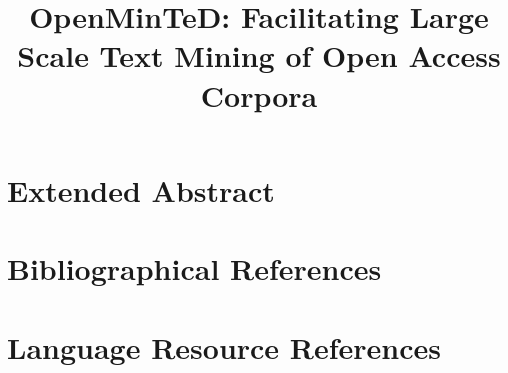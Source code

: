 \documentclass[10pt, a4paper]{article}
\title{OpenMinTeD: Facilitating Large Scale Text Mining of Open Access Corpora}
\begin{document}
\maketitleabstract

\section{Extended Abstract}


\section{Bibliographical References}
\label{main:ref}


%


\section{Language Resource References}
\label{lr:ref}
\end{document}
